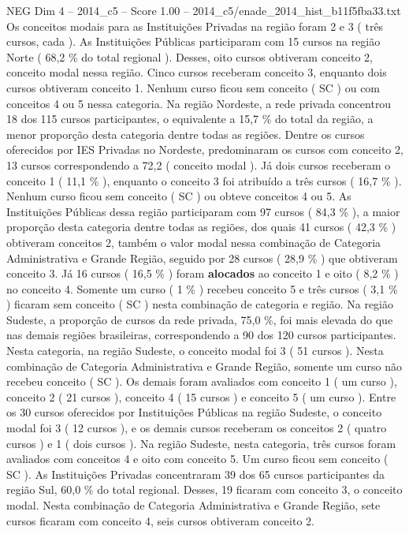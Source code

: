 \begin{textsample}{NEG Dim 4 – 2014\_c5 – Score 1.00 – 2014\_c5/enade\_2014\_hist\_b11f5fba33.txt}
Os conceitos modais para as Instituições Privadas na região foram 2 e 3 ( três cursos, cada ).
As Instituições Públicas participaram com 15 cursos na região Norte ( 68,2 \% do total regional ).
Desses, oito cursos obtiveram conceito 2, conceito modal nessa região.
Cinco cursos receberam conceito 3, enquanto dois cursos obtiveram conceito 1.
Nenhum curso ficou sem conceito ( SC ) ou com conceitos 4 ou 5 nessa categoria.
Na região Nordeste, a rede privada concentrou 18 dos 115 cursos participantes, o equivalente a 15,7 \% do total da região, a menor proporção desta categoria dentre todas as regiões.
Dentre os cursos oferecidos por IES Privadas no Nordeste, predominaram os cursos com conceito 2, 13 cursos correspondendo a 72,2 ( conceito modal ).
Já dois cursos receberam o conceito 1 ( 11,1 \% ), enquanto o conceito 3 foi atribuído a três cursos ( 16,7 \% ).
Nenhum curso ficou sem conceito ( SC ) ou obteve conceitos 4 ou 5.
As Instituições Públicas dessa região participaram com 97 cursos ( 84,3 \% ), a maior proporção desta categoria dentre todas as regiões, dos quais 41 cursos ( 42,3 \% ) obtiveram conceitos 2, também o valor modal nessa combinação de Categoria Administrativa e Grande Região, seguido por 28 cursos ( 28,9 \% ) que obtiveram conceito 3.
Já 16 cursos ( 16,5 \% ) foram \textbf{alocados} ao conceito 1 e oito ( 8,2 \% ) no conceito 4.
Somente um curso ( 1 \% ) recebeu conceito 5 e três cursos ( 3,1 \% ) ficaram sem conceito ( SC ) nesta combinação de categoria e região.
Na região Sudeste, a proporção de cursos da rede privada, 75,0 \%, foi mais elevada do que nas demais regiões brasileiras, correspondendo a 90 dos 120 cursos participantes.
Nesta categoria, na região Sudeste, o conceito modal foi 3 ( 51 cursos ).
Nesta combinação de Categoria Administrativa e Grande Região, somente um curso não recebeu conceito ( SC ).
Os demais foram avaliados com conceito 1 ( um curso ), conceito 2 ( 21 cursos ), conceito 4 ( 15 cursos ) e conceito 5 ( um curso ).
Entre os 30 cursos oferecidos por Instituições Públicas na região Sudeste, o conceito modal foi 3 ( 12 cursos ), e os demais cursos receberam os conceitos 2 ( quatro cursos ) e 1 ( dois cursos ).
Na região Sudeste, nesta categoria, três cursos foram avaliados com conceitos 4 e oito com conceito 5.
Um curso ficou sem conceito ( SC ).
As Instituições Privadas concentraram 39 dos 65 cursos participantes da região Sul, 60,0 \% do total regional.
Desses, 19 ficaram com conceito 3, o conceito modal.
Nesta combinação de Categoria Administrativa e Grande Região, sete cursos ficaram com conceito 4, seis cursos obtiveram conceito 2.

\end{textsample}
